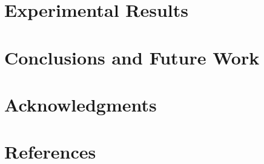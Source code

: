 \documentclass[11pt,psfig]{article}
\begin{document}
\section*{Experimental Results}

\section*{Conclusions and Future Work}

\section*{Acknowledgments}

\section*{References}    

\end{document}
